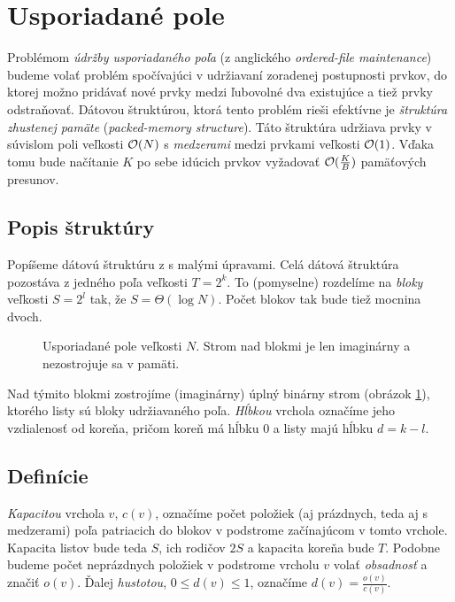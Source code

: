\section{Usporiadané pole} \label{sec:orderedfile}

Problémom \emph{údržby usporiadaného poľa} (z anglického \emph{ordered-file maintenance}) budeme volať problém spočívajúci v udržiavaní zoradenej postupnosti prvkov, do ktorej možno pridávať nové prvky medzi ľubovolné dva existujúce a tiež prvky odstraňovať. Dátovou štruktúrou, ktorá tento problém rieši efektívne je \emph{štruktúra zhustenej pamäte} (\emph{packed-memory structure}). Táto štruktúra udržiava prvky v súvislom poli veľkosti $\mathcal{O}(N)$ s \emph{medzerami} medzi prvkami veľkosti $\mathcal{O}(1)$. Vďaka tomu bude načítanie $K$ po sebe idúcich prvkov vyžadovať $\mathcal{O}(\frac{K}{B})$ pamäťových presunov.

\subsection{Popis štruktúry} \label{sec:of-desc}

Popíšeme dátovú štruktúru z \citep{btreeshort} s malými úpravami. Celá dátová štruktúra pozostáva z jedného poľa veľkosti $T = 2^k$. To (pomyselne) rozdelíme na \emph{bloky} veľkosti $S = 2^l$ tak, že $S=\Theta(\log{N})$. Počet blokov tak bude tiež mocnina dvoch.

\begin{figure}
    \centering
    \resizebox{0.8\textwidth}{!}{
        
    }
    \caption[Usporiadané pole]{Usporiadané pole veľkosti $N$. Strom nad blokmi je len imaginárny a nezostrojuje sa v pamäti.}
    \label{fig:of_overview}
\end{figure}

Nad týmito blokmi zostrojíme (imaginárny) úplný binárny strom (obrázok \ref{fig:of_overview}), ktorého listy sú bloky udržiavaného poľa. \emph{Hĺbkou} vrchola označíme jeho vzdialenosť od koreňa, pričom koreň má hĺbku $0$ a listy majú hĺbku $d = k-l$.

\subsection{Definície}

\emph{Kapacitou} vrchola $v$, $c(v)$, označíme počet položiek (aj prázdnych, teda aj s medzerami) poľa patriacich do blokov v podstrome začínajúcom v tomto vrchole. Kapacita listov bude teda $S$, ich rodičov $2S$ a kapacita koreňa bude $T$. Podobne budeme počet neprázdnych položiek v podstrome vrcholu $v$ volať \emph{obsadnosť} a značiť $o(v)$. Ďalej \emph{hustotou}, $0 \le d(v) \le 1$, označíme $d(v) = \frac{o(v)}{c(v)}$. 

